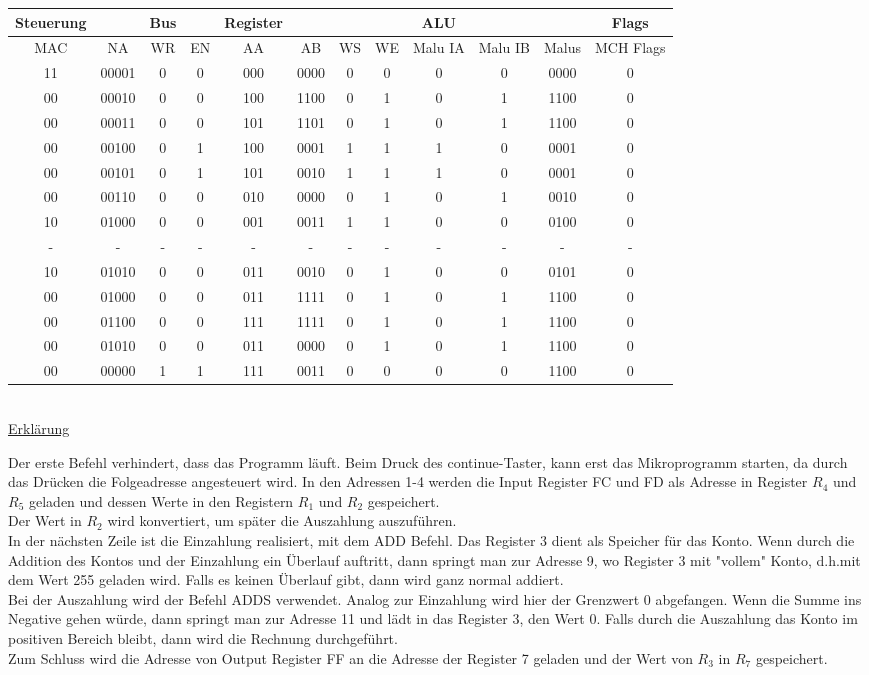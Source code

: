 \documentclass[paper=a4, fontsize=11pt]{scrartcl}
\numberwithin{equation}{section}
\numberwithin{figure}{section}
\numberwithin{table}{section}
\begin{document}
\begin{tabular}{|cc|cc|cccc|ccc|c|}
\hline
Steuerung & & Bus & & Register & & & & ALU & & & Flags \\
\hline
MAC & NA & WR & EN & AA & AB & WS & WE & Malu IA & Malu IB & Malus & MCH Flags \\
\hline
11 & 00001 & 0 & 0 & 000 & 0000 & 0 & 0 & 0 & 0 & 0000 & 0 \\
\hline
00 & 00010 & 0 & 0 & 100 & 1100 & 0 & 1 & 0 & 1 & 1100 & 0 \\
\hline
00 & 00011 & 0 & 0 & 101 & 1101 & 0 & 1 & 0 & 1 & 1100 & 0 \\
\hline
00 & 00100 & 0 & 1 & 100 & 0001 & 1 & 1 & 1 & 0 & 0001 & 0 \\
\hline
00 & 00101 & 0 & 1 & 101 & 0010 & 1 & 1 & 1 & 0 & 0001 & 0 \\
\hline
00 & 00110 & 0 & 0 & 010 & 0000 & 0 & 1 & 0 & 1 & 0010 & 0 \\
\hline
10 & 01000 & 0 & 0 & 001 & 0011 & 1 & 1 & 0 & 0 & 0100 & 0 \\
\hline
- & - & - & - & - & - & - & - & - & - & - & - \\
\hline
10 & 01010 & 0 & 0 & 011 & 0010 & 0 & 1 & 0 & 0 & 0101 & 0 \\
\hline
00 & 01000 & 0 & 0 & 011 & 1111 & 0 & 1 & 0 & 1 & 1100 & 0 \\
\hline
00 & 01100 & 0 & 0 & 111 & 1111 & 0 & 1 & 0 & 1 & 1100 & 0 \\
\hline
00 & 01010 & 0 & 0 & 011 & 0000 & 0 & 1 & 0 & 1 & 1100 & 0 \\
\hline
00 & 00000 & 1 & 1 & 111 & 0011 & 0 & 0 & 0 & 0 & 1100 & 0 \\
\hline
\end{tabular} \\

\underline{Erklärung}

Der erste Befehl verhindert, dass das Programm läuft. Beim Druck des continue-Taster, kann erst das Mikroprogramm starten, da durch das Drücken die Folgeadresse angesteuert wird. In den Adressen 1-4 werden die Input Register FC und FD als Adresse in Register $R_{4}$ und $R_{5}$ geladen und dessen Werte in den Registern $R_{1}$ und $R_{2}$ gespeichert. \\
Der Wert in $R_{2}$ wird konvertiert, um später die Auszahlung auszuführen. \\
In der nächsten Zeile ist die Einzahlung realisiert, mit dem ADD Befehl. Das Register 3 dient als Speicher für das Konto. Wenn durch die Addition des Kontos und der Einzahlung ein Überlauf auftritt, dann springt man zur Adresse 9, wo Register 3 mit "vollem" Konto, d.h.mit dem Wert 255 geladen wird. Falls es keinen Überlauf gibt, dann wird ganz normal addiert. \\
Bei der Auszahlung wird der Befehl ADDS verwendet. Analog zur Einzahlung wird hier der Grenzwert 0 abgefangen. Wenn die Summe ins Negative gehen würde, dann springt man zur Adresse 11 und lädt in das Register 3, den Wert 0. Falls durch die Auszahlung das Konto im positiven Bereich bleibt, dann wird die Rechnung durchgeführt. \\
Zum Schluss wird die Adresse von Output Register FF an die Adresse der Register 7 geladen und der Wert von $R_{3}$ in $R_{7}$ gespeichert.
\end{document}
